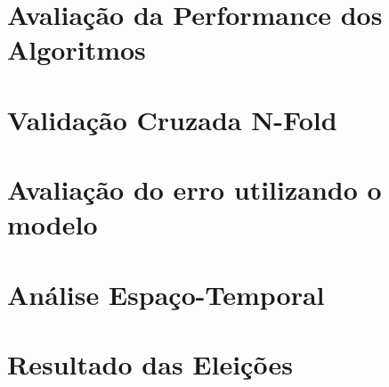 \section{Avaliação da Performance dos Algoritmos}

\section{Validação Cruzada N-Fold}

\section{Avaliação do erro utilizando o modelo}

\section{Análise Espaço-Temporal}

\section{Resultado das Eleições}


